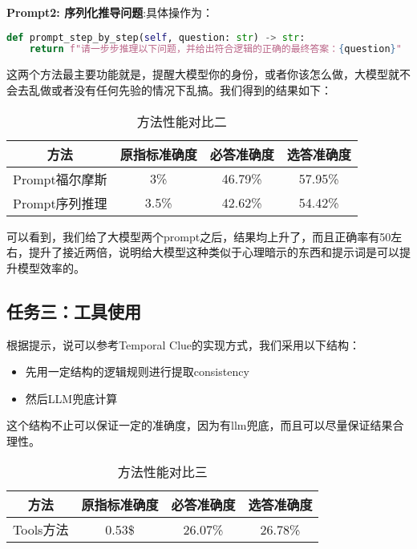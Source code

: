 \documentclass[answers]{exam}  %
\begin{document}
\textbf{Prompt2: 序列化推导问题}:具体操作为：
\begin{lstlisting}[language=python]
    def prompt_step_by_step(self, question: str) -> str:
    return f"请一步步推理以下问题，并给出符合逻辑的正确的最终答案：{question}"
\end{lstlisting}

这两个方法最主要功能就是，提醒大模型你的身份，或者你该怎么做，大模型就不会去乱做或者没有任何先验的情况下乱搞。我们得到的结果如下：

\begin{table}[h]
    \centering
    \begin{tabular}{cccc}
    \toprule
    \textbf{方法} & \textbf{原指标准确度} & \textbf{必答准确度} &\textbf{选答准确度}\\
    \midrule
    Prompt福尔摩斯 & 3\% & 46.79\% & 57.95\% \\
    \hline
    Prompt序列推理 & 3.5\% & 42.62\% & 54.42\% \\
    \bottomrule
    \end{tabular}
    \caption{方法性能对比二}
\end{table}

可以看到，我们给了大模型两个prompt之后，结果均上升了，而且正确率有50左右，提升了接近两倍，说明给大模型这种类似于心理暗示的东西和提示词是可以提升模型效率的。


\subsection{任务三：工具使用}

根据提示，说可以参考Temporal Clue的实现方式，我们采用以下结构：

\begin{itemize}
    \item 先用一定结构的逻辑规则进行提取consistency
    \item 然后LLM兜底计算
\end{itemize}

这个结构不止可以保证一定的准确度，因为有llm兜底，而且可以尽量保证结果合理性。


\begin{table}[h]
    \centering
    \begin{tabular}{cccc}
    \toprule
    \textbf{方法} & \textbf{原指标准确度} & \textbf{必答准确度} &\textbf{选答准确度}\\
    \midrule
    Tools方法 & 0.53\$ & 26.07\% & 26.78\% \\
    \bottomrule
    \end{tabular}
    \caption{方法性能对比三}
\end{table}
\end{document}

